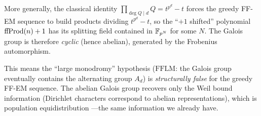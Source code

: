 More generally, the classical identity
$\prod_{\deg Q \mid d} Q = t^{p^d} - t$ forces the greedy FF-EM sequence
to build products dividing $t^{p^d} - t$, so the ``$+1$ shifted'' polynomial
$\mathrm{ffProd}(n) + 1$ has its splitting field contained in $\mathbb{F}_{p^{N}}$ for some
$N$. The Galois group is therefore \emph{cyclic} (hence abelian), generated
by the Frobenius automorphism.

This means the ``large monodromy'' hypothesis ($\mathrm{FFLM}$: the Galois
group eventually contains the alternating group $A_d$) is
\emph{structurally false} for the greedy FF-EM sequence. The abelian Galois
group recovers only the Weil bound information (Dirichlet characters
correspond to abelian representations), which is population equidistribution
---the same information we already have.

